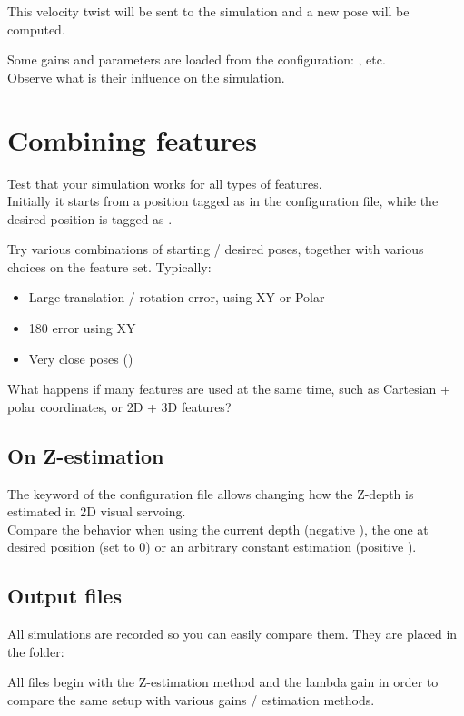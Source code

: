 \documentclass{ecnreport}
\begin{document}
This velocity twist will be sent to the simulation and a new pose will be computed.

Some gains and parameters are loaded from the configuration: , etc.\\
Observe what is their influence on the simulation.

\section{Combining features}

Test that your simulation works for all types of features. \\

Initially it starts from a position tagged as  in the configuration file, while the desired position is tagged as .

Try various combinations of starting / desired poses, together with various choices on the feature set. Typically:
\begin{itemize}
 \item Large translation / rotation error, using XY or Polar
 \item 180 error using XY
 \item Very close poses ()
\end{itemize}


What happens if many features are used at the same time, such as Cartesian + polar coordinates, or 2D + 3D features?

\subsection{On Z-estimation}

The  keyword of the configuration file allows changing how the Z-depth is estimated in 2D visual servoing.\\
Compare the behavior when using the current depth (negative ), the one at desired position (set  to 0) or an arbitrary constant estimation (positive ).

\subsection{Output files}

All simulations are recorded so you can easily compare them. They are placed in the folder:
\begin{center}
\end{center}
All files begin with the Z-estimation method and the lambda gain in order to compare the same setup with various gains / estimation methods.
\end{document}
